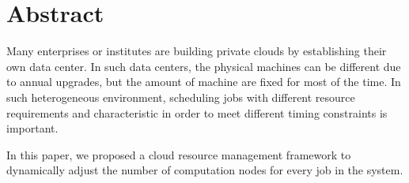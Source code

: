 \chapter{Abstract}
Many enterprises or institutes are building private clouds by
establishing their own data center.
In such data centers, the physical machines can be different due to
annual upgrades,  but the amount of machine are fixed for most of the
time.
In such heterogeneous environment, scheduling jobs with different
resource requirements and characteristic in order to meet different
timing constraints is important.

In this paper, we proposed a cloud resource management framework to
dynamically adjust the number of computation nodes for every job in the
system.

